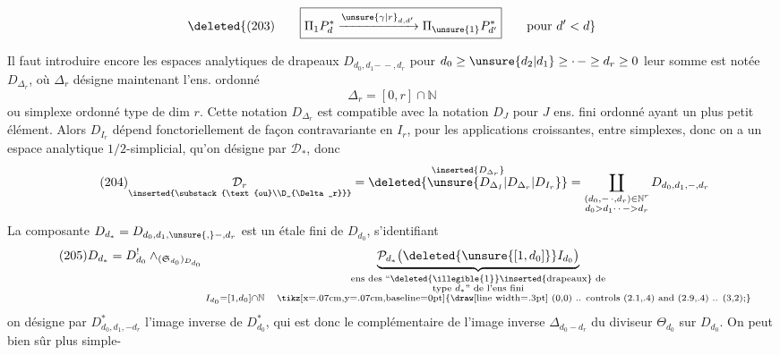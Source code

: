 \[
\deleted{(203)\qquad\boxed{\Pi_1P_d^*\xrightarrow{\unsure{\gamma|r}_{d,d'}}\Pi_{\unsure{1}}P_{d'}^*}\qquad\text{pour }d'<d}
\]

Il faut introduire encore les espaces analytiques
de drapeaux $D_{d_0,d_1\mathord{-\, -},d_r}$ pour $d_0\geq \unsure{d_2|d_1}\geq\mathord{\cdot\,-}\geq d_r\geq0$
leur somme est notée $D_{\Delta_r}$, où $\Delta_r$ désigne
maintenant l'ens. ordonné
\[
\tag{203}\Delta_r=[0,r]\cap\mathbb N
\]
ou simplexe ordonné type de dim $r$. Cette notation
$D_{\Delta_r}$ est compatible avec la notation $D_J$ pour $J$
ens. fini ordonné ayant un plus petit élément.
Alors $D_{I_r}$ dépend fonctoriellement de façon
contravariante en $I_r$, pour les applications
croissantes, entre simplexes, donc on a un
espace analytique $1/2$-simplicial, qu'on désigne par
$\mathcal D_*$, donc
\[
\tag{204}
\underset{\inserted{\substack{\text{ou}\\D_{\Delta_r}}}}{\mathcal D_r}
=\overset{\inserted{D_{\Delta_r}}}{\deleted{\unsure{D_{\Delta_I}|D_{\Delta_r}|D_{I_r}}}}
=\coprod_{\substack{(d_0,\mathord{-\,\cdot},d_r)\in\mathbb N^r\\d_0>d_1\mathord{\cdot\,\cdot\,-}>d_r}}
D_{d_0,d_1,\mathord{-},d_r}
\]
La composante $D_{d_*}=D_{d_0,d_1,\unsure{,}\mathord{-},d_r}$ est
un  étale fini de $D_{d_0}$, s'identifiant
\[
\tag{205}
D_{d_*}=D^{!}_{d_0}\wedge_{(\mathfrak S_{d_0})_{D_{d_0}}}
\underbrace{\mathcal P_{d_*}\bigl(\deleted{\unsure{[1,d_0]}}I_{d_0}\bigr)}_{
\substack{\text{ens des ``\deleted{\illegible{1}}\inserted{drapeaux} de}\\
\text{type }d_*\text{'' de l'ens fini}\\
I_{d_0}=[1,d_0]\cap\mathbb N\quad\text{\tikz[x=.07cm,y=.07cm,baseline=0pt]{\draw[line width=.3pt] (0,0) .. controls (2.1,.4) and (2.9,.4) .. (3,2);}}}}
\]
on désigne par $D^*_{d_0,d_1,\mathord{-}d_r}$ l'image inverse
de $D^*_{d_0}$, qui est donc le complémentaire
de l'image inverse $\Delta_{d_0-d_r}$ du diviseur
$\Theta_{d_0}$ sur $D_{d_0}$. On peut bien sûr plus simple-

